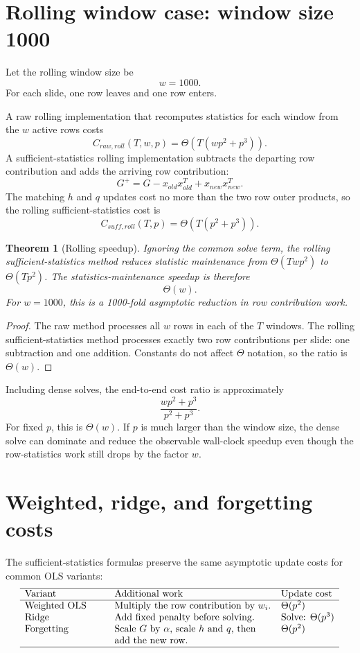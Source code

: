 \documentclass[11pt]{article}
\newtheorem{theorem}{Theorem}
\begin{document}
\section{Rolling window case: window size 1000}

Let the rolling window size be
\[
  w=1000 .
\]
For each slide, one row leaves and one row enters.

A raw rolling implementation that recomputes statistics for each window
from the \(w\) active rows costs
\[
  C_{raw,roll}(T,w,p)
  =
  \Theta(T(wp^2+p^3)).
\]
A sufficient-statistics rolling implementation subtracts the departing
row contribution and adds the arriving row contribution:
\[
  G^+ = G - x_{old}x_{old}^T + x_{new}x_{new}^T .
\]
The matching \(h\) and \(q\) updates cost no more than the two row
outer products, so the rolling sufficient-statistics cost is
\[
  C_{suff,roll}(T,p)
  =
  \Theta(T(p^2+p^3)).
\]

\begin{theorem}[Rolling speedup]
Ignoring the common solve term, the rolling sufficient-statistics method
reduces statistic maintenance from \(\Theta(Twp^2)\) to
\(\Theta(Tp^2)\).  The statistics-maintenance speedup is therefore
\[
  \Theta(w).
\]
For \(w=1000\), this is a 1000-fold asymptotic reduction in row
contribution work.
\end{theorem}

\begin{proof}
The raw method processes all \(w\) rows in each of the \(T\) windows.
The rolling sufficient-statistics method processes exactly two row
contributions per slide: one subtraction and one addition.  Constants
do not affect \(\Theta\) notation, so the ratio is \(\Theta(w)\).
\end{proof}

Including dense solves, the end-to-end cost ratio is approximately
\[
  \frac{wp^2+p^3}{p^2+p^3}.
\]
For fixed \(p\), this is \(\Theta(w)\).  If \(p\) is much larger than
the window size, the dense solve can dominate and reduce the observable
wall-clock speedup even though the row-statistics work still drops by
the factor \(w\).

\section{Weighted, ridge, and forgetting costs}

The sufficient-statistics formulas preserve the same asymptotic update
costs for common OLS variants:
\[
\begin{array}{>{\raggedright\arraybackslash}p{0.24\linewidth}
        >{\raggedright\arraybackslash}p{0.47\linewidth}
        >{\raggedright\arraybackslash}p{0.16\linewidth}}
\hline
Variant & Additional work & Update cost \\
\hline
Weighted OLS & Multiply the row contribution by \(w_i\). & \(\Theta(p^2)\) \\
Ridge & Add fixed penalty before solving. & Solve: \(\Theta(p^3)\) \\
Forgetting & Scale \(G\) by \(\alpha\), scale \(h\) and \(q\), then add
the new row. & \(\Theta(p^2)\) \\
\hline
\end{array}
\]
\end{document}
